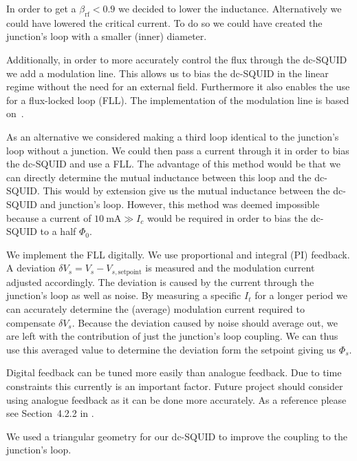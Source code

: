 In order to get a $\beta_{\text{rf}} < 0.9$ we decided to lower the inductance. Alternatively we could have lowered the critical current. To do so we could have created the junction's loop with a smaller (inner) diameter. 

Additionally, in order to more accurately control the flux through the dc-SQUID we add a modulation line. This allows us to bias the dc-SQUID in the linear regime without the need for an external field. Furthermore it also enables the use for a flux-locked loop (FLL). The implementation of the modulation line is based on~\cite{linYBaCuNano2020}.

As an alternative we considered making a third loop identical to the junction's loop without a junction. We could then pass a current through it in order to bias the dc-SQUID and use a FLL. The advantage of this method would be that we can directly determine the mutual inductance between this loop and the dc-SQUID. This would by extension give us the mutual inductance between the dc-SQUID and junction's loop. However, this method was deemed impossible because a current of $\qty{10}{\milli\ampere} \gg I_c$ would be required in order to bias the dc-SQUID to a half $\Phi_0$.

We implement the FLL digitally. We use proportional and integral (PI) feedback. A deviation $\delta V_s = V_s - V_{s,\text{setpoint}}$ is measured and the modulation current adjusted accordingly. The deviation is caused by the current through the junction's loop as well as noise. By measuring a specific $I_t$ for a longer period we can accurately determine the (average) modulation current required to compensate $\delta V_s$. Because the deviation caused by noise should average out, we are left with the contribution of just the junction's loop coupling. We can thus use this averaged value to determine the deviation form the setpoint giving us $\Phi_s$.

Digital feedback can be tuned more easily than analogue feedback. Due to time constraints this currently is an important factor. Future project should consider using analogue feedback as it can be done more accurately. As a reference please see Section~4.2.2 in \cite{zhangSQUIDReadoutElectronics2020}.

We used a triangular geometry for our dc-SQUID to improve the coupling to the junction's loop.


